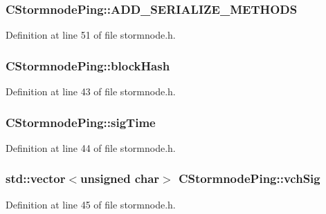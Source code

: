 \subsubsection[{A\+D\+D\+\_\+\+S\+E\+R\+I\+A\+L\+I\+Z\+E\+\_\+\+M\+E\+T\+H\+O\+D\+S}]{\setlength{\rightskip}{0pt plus 5cm}C\+Stormnode\+Ping\+::\+A\+D\+D\+\_\+\+S\+E\+R\+I\+A\+L\+I\+Z\+E\+\_\+\+M\+E\+T\+H\+O\+D\+S}\label{class_c_stormnode_ping_af7de3b992f923d3fef5d2796264c1698}


Definition at line 51 of file stormnode.\+h.

\hypertarget{class_c_stormnode_ping_a8a77ddaf2c49e48d306c05022e4e6b28}{}
\subsubsection[{block\+Hash}]{ C\+Stormnode\+Ping\+::block\+Hash}\label{class_c_stormnode_ping_a8a77ddaf2c49e48d306c05022e4e6b28}


Definition at line 43 of file stormnode.\+h.

\hypertarget{class_c_stormnode_ping_a9444c0ea28227eac0f3b3a0266ce0e9e}{}
\subsubsection[{sig\+Time}]{ C\+Stormnode\+Ping\+::sig\+Time}\label{class_c_stormnode_ping_a9444c0ea28227eac0f3b3a0266ce0e9e}


Definition at line 44 of file stormnode.\+h.

\hypertarget{class_c_stormnode_ping_af0e27eadd1e12a8c75540c012d835ce1}{}
\subsubsection[{vch\+Sig}]{\setlength{\rightskip}{0pt plus 5cm}std\+::vector$<$unsigned char$>$ C\+Stormnode\+Ping\+::vch\+Sig}\label{class_c_stormnode_ping_af0e27eadd1e12a8c75540c012d835ce1}


Definition at line 45 of file stormnode.\+h.

